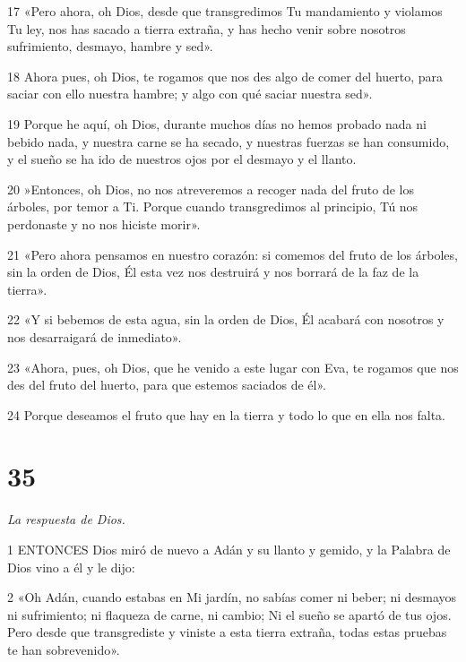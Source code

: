 \par 17 «Pero ahora, oh Dios, desde que transgredimos Tu mandamiento y violamos Tu ley, nos has sacado a tierra extraña, y has hecho venir sobre nosotros sufrimiento, desmayo, hambre y sed».

\par 18 Ahora pues, oh Dios, te rogamos que nos des algo de comer del huerto, para saciar con ello nuestra hambre; y algo con qué saciar nuestra sed».

\par 19 Porque he aquí, oh Dios, durante muchos días no hemos probado nada ni bebido nada, y nuestra carne se ha secado, y nuestras fuerzas se han consumido, y el sueño se ha ido de nuestros ojos por el desmayo y el llanto.

\par 20 »Entonces, oh Dios, no nos atreveremos a recoger nada del fruto de los árboles, por temor a Ti. Porque cuando transgredimos al principio, Tú nos perdonaste y no nos hiciste morir».

\par 21 «Pero ahora pensamos en nuestro corazón: si comemos del fruto de los árboles, sin la orden de Dios, Él esta vez nos destruirá y nos borrará de la faz de la tierra».

\par 22 «Y si bebemos de esta agua, sin la orden de Dios, Él acabará con nosotros y nos desarraigará de inmediato».

\par 23 «Ahora, pues, oh Dios, que he venido a este lugar con Eva, te rogamos que nos des del fruto del huerto, para que estemos saciados de él».

\par 24 Porque deseamos el fruto que hay en la tierra y todo lo que en ella nos falta.

\chapter{35}

\par \textit{La respuesta de Dios.}

\par 1 ENTONCES Dios miró de nuevo a Adán y su llanto y gemido, y la Palabra de Dios vino a él y le dijo:

\par 2 «Oh Adán, cuando estabas en Mi jardín, no sabías comer ni beber; ni desmayos ni sufrimiento; ni flaqueza de carne, ni cambio; Ni el sueño se apartó de tus ojos. Pero desde que transgrediste y viniste a esta tierra extraña, todas estas pruebas te han sobrevenido».

